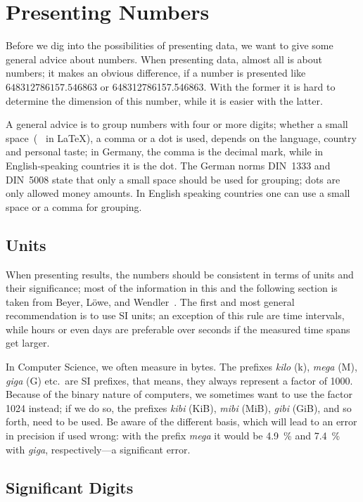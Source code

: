 \section{Presenting Numbers}

Before we dig into the possibilities of presenting data, we want to give some
general advice about numbers.  When presenting data, almost all is about
numbers; it makes an obvious difference, if a number is presented like
$648312786157.546863$ or \num{648312786157.546863}.  With the former it is hard
to determine the dimension of this number, while it is easier with the latter.

A general advice is to group numbers with four or more digits; whether a small
space~(\texttt{\,} in \LaTeX), a comma or a dot is used, depends on
the language, country and personal taste; in Germany, the comma is the decimal
mark, while in English-speaking countries it is the dot.  The German norms
DIN~1333 and DIN~5008 state that only a small space should be used for grouping;
dots are only allowed money amounts.  In English speaking countries one can use
a small space or a comma for grouping.

\subsection{Units}

When presenting results, the numbers should be consistent in terms of units and
their significance; most of the information in this and the following section is
taken from Beyer, Löwe, and Wendler~\cite{BeyerLoeweWendler2016}.  The first and
most general recommendation is to use SI units; an exception of this rule are
time intervals, while hours or even days are preferable over seconds if the
measured time spans get larger.

In Computer Science, we often measure in bytes.  The prefixes \emph{kilo} (k),
\emph{mega} (M), \emph{giga} (G) etc.\ are SI prefixes, that means, they always
represent a factor of \num{1000}.  Because of the binary nature of computers, we
sometimes want to use the factor \num{1024} instead; if we do so, the prefixes
\emph{kibi} (KiB), \emph{mibi} (MiB), \emph{gibi} (GiB), and so forth, need to
be used.  Be aware of the different basis, which will lead to an error in
precision if used wrong: with the prefix \emph{mega} it would be
\SI{4.9}{\percent} and \SI{7.4}{\percent} with \emph{giga}, respectively—a
significant error.

\subsection{Significant Digits}

